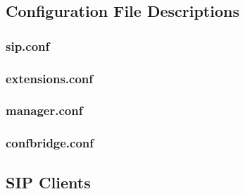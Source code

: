 \documentclass[a4paper,11pt]{report}
\begin{document}
\newpage
\subsection{Configuration File Descriptions}

\subsubsection{sip.conf}
\lstset{escapechar=@,style=customc}


\subsubsection{extensions.conf}


\subsubsection{manager.conf}


\subsubsection{confbridge.conf}


\newpage
\subsection{SIP Clients}
\end{document}
